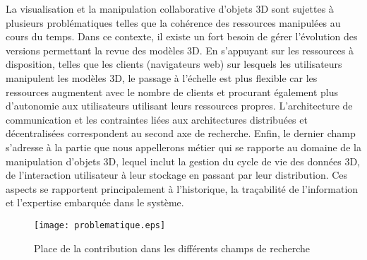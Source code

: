 La visualisation et la manipulation collaborative d'objets \gls{3D} sont sujettes à 
plusieurs problématiques telles que la cohérence des ressources manipulées au 
cours du temps. Dans ce contexte, il existe un fort besoin de gérer l'évolution des 
versions permettant la revue des modèles \gls{3D}. 
En s'appuyant sur les ressources à disposition, telles que les clients (navigateurs 
web) sur lesquels les utilisateurs manipulent les modèles \gls{3D}, le passage à 
l'échelle est plus flexible car les ressources augmentent avec le nombre de clients 
et procurant également plus d'autonomie aux utilisateurs utilisant leurs ressources 
propres.
L'architecture de communication et les contraintes liées aux architectures 
distribuées et décentralisées correspondent au second axe de recherche. 
Enfin, le dernier champ 
s'adresse à la partie que nous appellerons \og métier\fg{} qui se rapporte au 
domaine de la manipulation d'objets 3D, lequel inclut la 
gestion du cycle de vie des données 3D, de l'interaction utilisateur à leur stockage 
en passant par leur distribution. Ces aspects se rapportent principalement à 
l'historique, la traçabilité de l'information et l'expertise embarquée dans le système.

\begin{figure}[hbt]
	\centering
	\texttt{[image: problematique.eps]}
	\caption{Place de la contribution dans les différents champs de recherche}
	\label{fig:problematique}
\end{figure}

